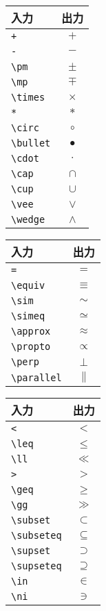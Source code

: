 \begin{minipage}{0.25\hsize}
\begin{tabular}{lc}
入力 & 出力 \\ \hline
\verb|+| & $+$ \\
\verb|-| & $-$ \\
\verb|\pm| & $\pm$ \\
\verb|\mp| & $\mp$ \\
\verb|\times| & $\times$ \\
\verb|*| & $*$ \\
\verb|\circ| & $\circ$ \\
\verb|\bullet| & $\bullet$ \\
\verb|\cdot| & $\cdot$ \\
\verb|\cap| & $\cap$ \\
\verb|\cup| & $\cup$ \\
\verb|\vee| & $\vee$ \\
\verb|\wedge| & $\wedge$ \\
\end{tabular}
\end{minipage}
\begin{minipage}{0.25\hsize}
\begin{tabular}{lc}
入力 & 出力 \\ \hline
\verb|=| & $=$ \\
\verb|\equiv| & $\equiv$ \\
\verb|\sim| & $\sim$ \\
\verb|\simeq| & $\simeq$ \\
\verb|\approx| & $\approx$ \\
\verb|\propto| & $\propto$ \\
\verb|\perp| & $\perp$ \\
\verb|\parallel| & $\parallel$ \\
\end{tabular}
\end{minipage}
\begin{minipage}{0.25\hsize}
\begin{tabular}{lc}
入力 & 出力 \\ \hline
\verb|<| & $<$ \\
\verb|\leq| & $\leq$ \\
\verb|\ll| & $\ll$ \\
\verb|>| & $>$ \\
\verb|\geq| & $\geq$ \\
\verb|\gg| & $\gg$ \\
\verb|\subset| & $\subset$ \\
\verb|\subseteq| & $\subseteq$ \\
\verb|\supset| & $\supset$ \\
\verb|\supseteq| & $\supseteq$ \\
\verb|\in| & $\in$ \\
\verb|\ni| & $\ni$ \\
\end{tabular}
\end{minipage}
